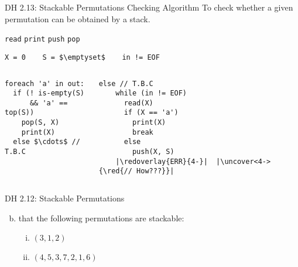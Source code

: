 \begin{frame}[fragile]{}
  \begin{exampleblock}{DH 2.13: Stackable Permutations Checking Algorithm}
    To check whether a given permutation can be obtained by a stack.

    \centerline{\texttt{read} \quad \texttt{print} \quad \texttt{push} \quad \texttt{pop} \quad {}}
  \end{exampleblock}


  \begin{lstlisting}[style = Cstyle]
              X = 0    S = $\emptyset$    in != EOF
  \end{lstlisting}

  \begin{columns}
    \pause
      \begin{lstlisting}[style = Cstyle]
foreach 'a' in out:
  if (! is-empty(S) 
      && 'a' == top(S))
    pop(S, X)
    print(X)
  else $\cdots$ // T.B.C
      \end{lstlisting}
    \pause
      \begin{lstlisting}[style = Cstyle]
  else // T.B.C
    while (in != EOF)
      read(X)
      if (X == 'a')
        print(X)
        break
      else
        push(X, S)
    |\redoverlay{ERR}{4-}|  |\uncover<4->{\red{// How???}}|
      \end{lstlisting}
  \end{columns}
\end{frame}

\begin{frame}{}
  \begin{exampleblock}{DH 2.12: Stackable Permutations}
    \begin{enumerate}[(a)]
      \setcounter{enumi}{1}
    \item {} that the following permutations are \emph{} stackable:
	\begin{enumerate}[(i)]
	  \item $(3, 1, 2)$
	  \item $(4, 5, 3, 7, 2, 1, 6)$
	\end{enumerate}
    \end{enumerate}
  \end{exampleblock}



\end{frame}

